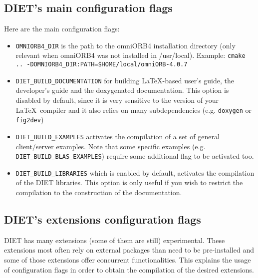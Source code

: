 \subsection{DIET's main configuration flags}

Here are the main configuration flags:
\begin{itemize}
\item
  \verb+OMNIORB4_DIR+ is the path to the omniORB4 installation directory
  (only relevant when omniORB4 was not installed in /usr/local).
  Example: \verb+cmake .. -DOMNIORB4_DIR:PATH=$HOME/local/omniORB-4.0.7+

\item
  \verb+DIET_BUILD_DOCUMENTATION+ for building LaTeX-based user's guide,
  the developer's guide and the doxygenated documentation.
  This option is disabled by default, since it is very sensitive to the
  version of your \LaTeX\ compiler and it also relies on many subdependencies
  (e.g. \verb+doxygen+ or \verb+fig2dev+)

\item
  \verb+DIET_BUILD_EXAMPLES+ activates the compilation of a set of
  general client/server examples. Note that some specific examples
  (e.g. \verb+DIET_BUILD_BLAS_EXAMPLES+) require some additional flag
  to be activated too.

\item
  \verb+DIET_BUILD_LIBRARIES+ which is enabled by default, activates the
  compilation of the DIET libraries. This option is only useful if you 
  wish to restrict the compilation to the construction of the documentation.
\end{itemize}

\subsection{DIET's extensions configuration flags}

DIET has many extensions (some of them are still) experimental. These
extensions most often rely on external packages than need to be pre-installed
and some of those extensions offer concurrent functionalities. This explains
the usage of configuration flags in order to obtain the compilation of
the desired extensions.

